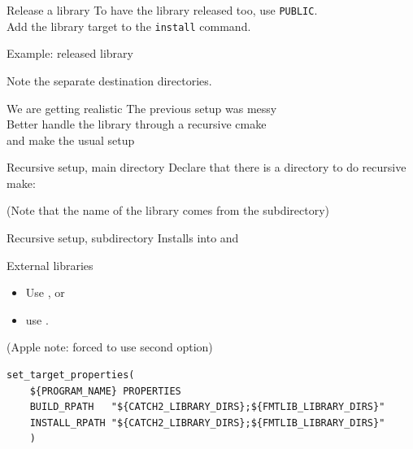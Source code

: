 \begin{numberedframe}{Release a library}
  To have the library released too, use \lstinline{PUBLIC}.\\
  Add the library target to the \lstinline{install} command.
\end{numberedframe}

\begin{numberedframe}{Example: released library}
  \lstset{numbers=left,numberstyle=\tiny}
    
  Note the separate destination directories.
\end{numberedframe}

\begin{numberedframe}{We are getting realistic}
  The previous setup was messy\\
  Better handle the library through a recursive cmake\\
  and make the usual    setup
\end{numberedframe}

\begin{numberedframe}{Recursive setup, main directory}
  Declare that there is a directory to do recursive make:
  \lstset{numbers=left,numberstyle=\tiny}
  
  (Note that the name of the library comes from the subdirectory)
\end{numberedframe}

\begin{numberedframe}{Recursive setup, subdirectory}
  Installs into  and 
  \lstset{numbers=left,numberstyle=\tiny}
  
\end{numberedframe}

\begin{numberedframe}{External libraries}
  \begin{itemize}
  \item Use , or
  \item use .
  \end{itemize}
  (Apple note: forced to use second option)
\begin{lstlisting}[basicstyle=\scriptsize\ttfamily]
set_target_properties(
    ${PROGRAM_NAME} PROPERTIES
    BUILD_RPATH   "${CATCH2_LIBRARY_DIRS};${FMTLIB_LIBRARY_DIRS}"
    INSTALL_RPATH "${CATCH2_LIBRARY_DIRS};${FMTLIB_LIBRARY_DIRS}"
    )
\end{lstlisting}
\end{numberedframe}

